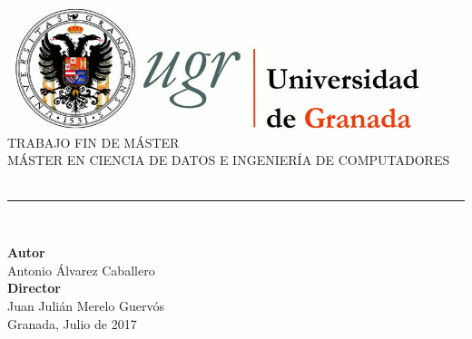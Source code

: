 \begin{titlepage}


\newlength{\centeroffset}
\setlength{\centeroffset}{-0.5\oddsidemargin}
\addtolength{\centeroffset}{0.5\evensidemargin}
\thispagestyle{empty}

\noindent\hspace*{\centeroffset}\begin{minipage}{\textwidth}

\centering
\includegraphics[width=0.9\textwidth]{imagenes/logo_ugr.jpg}\\[1.4cm]

\textsc{ \Large TRABAJO FIN DE MÁSTER\\[0.2cm]}
\textsc{ MÁSTER EN CIENCIA DE DATOS E INGENIERÍA DE COMPUTADORES}\\[1cm]
%
{\Huge\bfseries \titulo\\
}
\noindent\rule[-1ex]{\textwidth}{3pt}\\[3.5ex]
\end{minipage}

\vspace{2.0cm}
\noindent\hspace*{\centeroffset}\begin{minipage}{\textwidth}
\centering

\textbf{Autor}\\ {Antonio Álvarez Caballero}\\[2.5ex]
\textbf{Director}\\
{Juan Julián Merelo Guervós}\\[2cm]

Granada, Julio de 2017
\end{minipage}
\end{titlepage}
